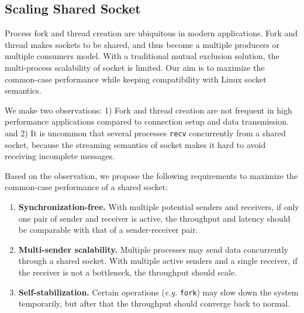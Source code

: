 

\subsection{Scaling Shared Socket}
\label{subsec:fork}
Process fork and thread creation are ubiquitous in modern applications. 
Fork and thread makes sockets to be shared, and thus become a multiple producers or multiple consumers model. With a traditional mutual exclusion solution, the multi-process scalability of socket is limited. Our aim is to maximize the common-case performance while keeping compatibility with Linux socket semantics.

We make two observations: 1) Fork and thread creation are not frequent in high performance applications compared to connection setup and data transmission. 
and 2) It is uncommon that several processes \texttt{recv} concurrently from a shared socket, because the streaming semantics of socket makes it hard to avoid receiving incomplete messages. 

Based on the observation, we propose the following requirements to maximize the common-case performance of a shared socket:

\begin{enumerate}
 \item \textbf{Synchronization-free.} With multiple potential senders and receivers, if only one pair of sender and receiver is active, the throughput and latency should be comparable with that of a sender-receiver pair.
 \item \textbf{Multi-sender scalability.} Multiple processes may send data concurrently through a shared socket. With multiple active senders and a single receiver, if the receiver is not a bottleneck, the throughput should scale.
 \item \textbf{Self-stabilization.} Certain operations (\textit{e.g.} \texttt{fork}) may slow down the system temporarily, but after that the throughput should converge back to normal.
\end{enumerate}

